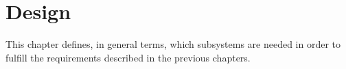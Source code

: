\chapter{Design}

This chapter defines, in general terms, which subsystems are needed in order to fulfill the requirements described in the previous chapters.




